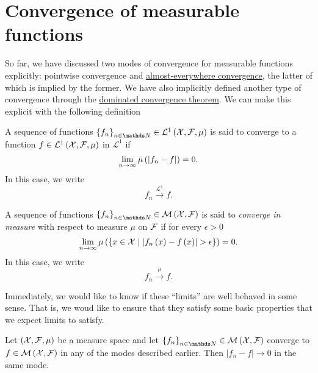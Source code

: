 \section{Convergence of measurable functions}

So far, we have discussed two modes of convergence for measurable
functions explicitly: pointwise convergence and \hyperref[def:convAlmostEverywhere]{almost-everywhere convergence},
the latter of which is implied by the former. We have also implicitly
defined another type of convergence through the \hyperref[thm:dominatedConvergenceLebInt]{dominated convergence theorem}.
We can make this explicit with the following definition
\begin{defn}[Convergence in $L^{1}$]
\label{def:L1Convergence}A sequence of functions $\left\{ f_{n}\right\} _{n\in\N}\in\Lp 1{\X,\F,\mu}$
is said to converge to a function $f\in\mathcal{L}^{1}\left(\mathcal{X},\mathcal{F},\mu\right)$ in $\mathcal{L}^{1}$
if 
\[
\lim_{n\to\infty}\bar{\mu}\left(\lvert f_{n}-f\rvert\right)=0.
\]
In this case, we write 
\[
f_{n}\stackrel{\mathcal{L}^{1}}{\longrightarrow}f.
\]
\end{defn}

\begin{defn}
\label{def:convergenceInMeasure}A sequence of functions $\left\{ f_{n}\right\} _{n\in\N}\in\measurableFunctions$
is said to \emph{converge in measure }with respect to measure $\mu$
on $\mathcal{F}$ if for every $\epsilon>0$
\[
\lim_{n\to\infty}\mu\left(\left\{ x\in\mathcal{X}\mid\lvert f_{n}\left(x\right)-f\left(x\right)\rvert>\epsilon\right\} \right)=0.
\]
In this case, we write
\[
f_{n}\stackrel{\mu}{\longrightarrow}f.
\]

Immediately, we would like to know if these ``limits'' are well
behaved in some sense. That is, we woud like to ensure that they satisfy
some basic properties that we expect limits to satisfy.
\end{defn}

\begin{prop}
\label{prop:convFconvAbsFnMinusF}Let $(\mathcal{X},\mathcal{F},\mu)$ be a measure
space and let $\left\{ f_{n}\right\} _{n\in\N}\in\measurableFunctions$
converge to $f\in\mathcal{M}\left(\mathcal{X},\mathcal{F}\right)$ in any of the modes described
earlier. Then $\lvert f_{n}-f\rvert\to0$ in the same mode.
\end{prop}

